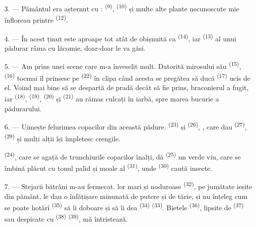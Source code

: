 3. --- Pământul era așternut cu :  \textsuperscript{(9)},  \textsuperscript{(10)} și multe
alte plante necunoscute mie înfloreau printre 
\textsuperscript{(12)}.

4. --- În acest ținut  este aproape tot atât de obișnuită ca
 \textsuperscript{(14)}, iar 
\textsuperscript{(13)} al unui pădurar râma cu lăcomie, doar-doar le va găsi.

\VUsaut{3.0mm}
\VUsaut{3.0mm}

5. --- Am prins  unei scene care m-a înveselit mult. Datorită
mirosului  său \textsuperscript{(15)}, 
\textsuperscript{(16)} tocmai îl prinsese pe 
\textsuperscript{(22)} în clipa când acesta se pregătea să ducă 
\textsuperscript{(17)} ucis de el. Voind mai bine să se despartă de pradă decât să
fie prins, braconierul a fugit, iar  \textsuperscript{(18)},
 \textsuperscript{(19)}, 
\textsuperscript{(20)} și  \textsuperscript{(21)} au rămas culcați
în iarbă, spre marea bucurie a pădurarului.

6. --- Uimește felurimea copacilor din această pădure. 
\textsuperscript{(23)} și  \textsuperscript{(26)},
, care dau  \textsuperscript{(27)},
 \textsuperscript{(29)} și mulți alții își împletesc crengile.

 \textsuperscript{(24)}, care se agață de trunchiurile copacilor
înalți, dă  \textsuperscript{(25)} un verde viu, care se
îmbină plăcut cu tonul palid și moale al 
\textsuperscript{(31)}, unde  \textsuperscript{(30)} caută
insecte.

\VUsaut{3.0mm}
\VUsaut{3.0mm}

7. --- Stejarii bătrâni m-au fermecat.  lor mari și noduroase
\textsuperscript{(32)}, pe jumătate ieșite din pământ, le dau o înfățișare minunată
de putere și de tărie, și nu înțeleg cum se poate hotărî 
\textsuperscript{(35)} să îi doboare și să îi dea 
\textsuperscript{(34)}  \textsuperscript{(33)}.
Bietele  \textsuperscript{(36)}, lipsite de 
\textsuperscript{(37)} sau despicate cu  \textsuperscript{(38)}
 \textsuperscript{(39)}, mă întristează.

